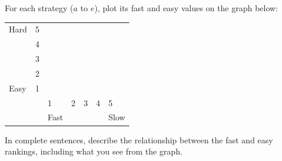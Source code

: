 \Q For each strategy ($a$ to $e$), plot its fast and easy values on the graph below:

\begin{table}[h]
\centering
\renewcommand{\arraystretch}{1.6}
\begin{tabularx}{275pt}{X C{28pt} | C{28pt} C{28pt} C{28pt} C{28pt} C{28pt}}
Hard & 5 \\
     & 4 \\
     & 3 \\
     & 2 \\
Easy & 1 \\
\hline
     & & 1    & 2 & 3 & 4 & 5    \\
     & & Fast &   &   &   & Slow \\
\end{tabularx}
\end{table}


\Q In complete sentences, describe the relationship between the fast and easy rankings, including what you see from the graph. 

\begin{answer}
\end{answer}
